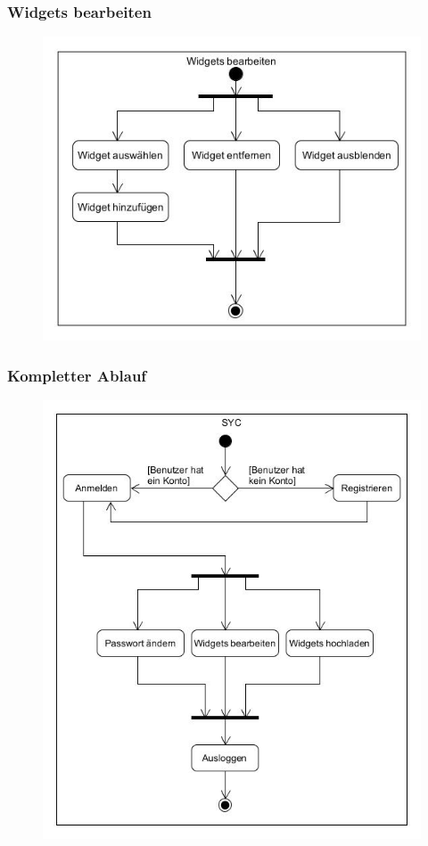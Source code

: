 		\subsubsection{Widgets bearbeiten}
		
			\begin{figure}[H]
				\includegraphics[scale=0.6]{images/UC4Activity}
			\end{figure}
		
		\subsubsection{Kompletter Ablauf}
		
			\begin{figure}[H]
				\includegraphics[scale=0.6]{images/ActivityComplete}
			\end{figure}
	
